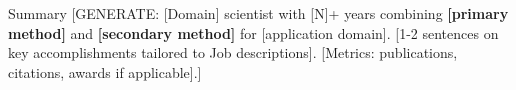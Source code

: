 \documentclass{resume}
\begin{document}
%
%
%
%

\vspace{-0.15cm}

\begin{rSection}{Summary}
[GENERATE: [Domain] scientist with [N]+ years combining \textbf{[primary method]} and \textbf{[secondary method]} for [application domain]. [1-2 sentences on key accomplishments tailored to Job descriptions]. [Metrics: publications, citations, awards if applicable].]
\end{rSection}
\vspace{-0.15cm}
\end{document}
